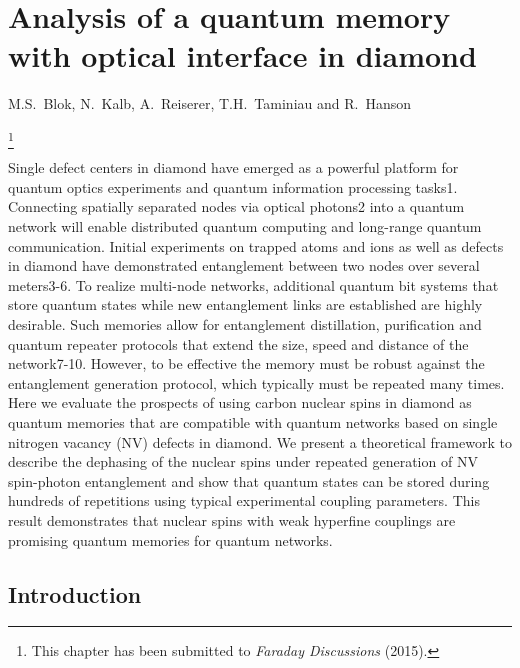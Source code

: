 \graphicspath{{./ch_C13_dephasing_LDE/figures/}}


\chapter{Analysis of a quantum memory with optical interface in diamond }
\label{ch:CDL}

\begin{center} 
    \vspace{-1cm} {M.S.~Blok, N.~Kalb, A.~Reiserer, T.H.~Taminiau and R.~Hanson} 
\end{center}


{\renewcommand{\thefootnote}{}\footnote{This chapter has been submitted to
    {\em Faraday Discussions} (2015).}}


\vspace{-0.5cm} 

Single defect centers in diamond have emerged as a powerful platform for quantum optics experiments and quantum information processing tasks1. Connecting spatially separated nodes via optical photons2 into a quantum network will enable distributed quantum computing and long-range quantum communication. Initial experiments on trapped atoms and ions as well as defects in diamond have demonstrated entanglement between two nodes over several meters3-6. To realize multi-node networks, additional quantum bit systems that store quantum states while new entanglement links are established are highly desirable. Such memories allow for entanglement distillation, purification and quantum repeater protocols that extend the size, speed and distance of the network7-10. However, to be effective the memory must be robust against the entanglement generation protocol, which typically must be repeated many times. Here we evaluate the prospects of using carbon nuclear spins in diamond as quantum memories that are compatible with quantum networks based on single nitrogen vacancy (NV) defects in diamond. We present a theoretical framework to describe the dephasing of the nuclear spins under repeated generation of NV spin-photon entanglement and show that quantum states can be stored during hundreds of repetitions using typical experimental coupling parameters. This result demonstrates that nuclear spins with weak hyperfine couplings are promising quantum memories for quantum networks.
\clearpage

\section{Introduction}

